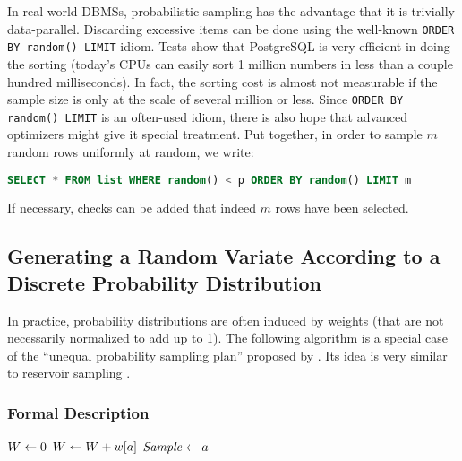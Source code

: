In real-world DBMSs, probabilistic sampling has the advantage that it is trivially data-parallel. Discarding excessive items can be done using the well-known \texttt{ORDER BY random() LIMIT} idiom. Tests show that PostgreSQL is very efficient in doing the sorting (today's CPUs can easily sort 1 million numbers in less than a couple hundred milliseconds). In fact, the sorting cost is almost not measurable if the sample size is only at the scale of several million or less. Since \texttt{ORDER BY random() LIMIT} is an often-used idiom, there is also hope that advanced optimizers might give it special treatment. Put together, in order to sample $m$ random rows uniformly at random, we write:
\begin{lstlisting}[language=SQL]
	SELECT * FROM list WHERE random() < p ORDER BY random() LIMIT m
\end{lstlisting}
If necessary, checks can be added that indeed $m$ rows have been selected.


\subsection{Generating a Random Variate According to a Discrete Probability Distribution}

In practice, probability distributions are often induced by weights (that are not necessarily normalized to add up to 1). The following algorithm is a special case of the ``unequal probability sampling plan'' proposed by \textcite{C82a}. Its idea is very similar to reservoir sampling \cite{MB83a}.

\subsubsection{Formal Description}

\begin{algorithm}[WeightedSample$(A, w)$] \label{alg:WeightedSample}
\begin{algorithmic}[1]
	\State $W \leftarrow 0$
		\State $W \leftarrow W + w[a]$ \label{alg:WeightedSample:UpdateWeight}
		 \label{alg:WeightedSample:Prob}
			\State $\mathit{Sample} \leftarrow a$ \label{alg:WeightedSample:SetSample}
		\EndWith
	\EndFor
\end{algorithmic}
\end{algorithm}

